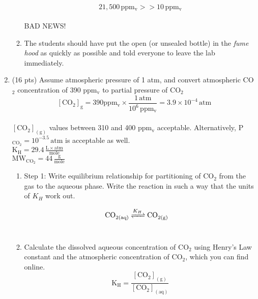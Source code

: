 \documentclass[12pt,letterpaper]{article}
\begin{document}
\begin{enumerate}
\begin{enumerate}
\begin{equation*}
\mathrm{21,500 \, ppm_v >> 10 \, ppm_v}
\end{equation*}\\

BAD NEWS!

\item The students should have put the open (or unsealed bottle) in the \emph{fume hood} as quickly as possible and told everyone to leave the lab immediately.\\
\end{enumerate}

\item (16 pts)
Assume atmospheric pressure of 1 atm, and convert atmospheric CO$_2$ concentration of 390 ppm$\mathrm{_v}$ to partial pressure of $\mathrm{CO_2}$\\

\begin{equation*}
\mathrm{[CO_{2}]_g = 390 ppm_v\times \frac{1\, atm}{10^6\, ppm_v} = 3.9\times 10^{-4}\, atm} 
\end{equation*}\\

$\mathrm{[CO_2]_{(g)}}$ values between 310 and 400 ppm$\mathrm{_v}$ acceptable.  Alternatively, P$\mathrm{_{CO_2} = 10^{-3.5}\, atm}$ is acceptable as well.\\

$\mathrm{K_H = 29.4\, \frac{L\times atm}{mole}}$\\

$\mathrm{MW_{CO_2} = 44\, \frac{g}{mole}}$\\

\begin{enumerate}
\item Step 1: Write equilibrium relationship for partitioning of $\mathrm{CO_2}$ from the gas to the aqueous phase.  Write the reaction in such a way that the units of $K_H$ work out.

\begin{align*}
\cee{CO_{2(aq)} &<=>[K_H] CO_{2(g)}} 
\end{align*}\\

\item Calculate the dissolved aqueous concentration of $\mathrm{CO_2}$ using Henry's Law constant and the atmospheric concentration of $\mathrm{CO_2}$, which you can find online.\\

\begin{equation*}
\mathrm{K_H = \frac{[CO_{2}]_{(g)}}{[CO_{2}]_{(aq)}}} 
\end{equation*}\\


\end{enumerate}
\end{enumerate}
\end{document}
